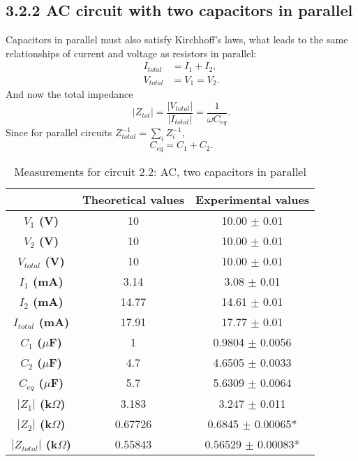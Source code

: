 \documentclass[a4paper, 12pt]{article}
\begin{document}
\subsection{3.2.2 AC circuit with two capacitors in parallel}
Capacitors in parallel must also satisfy Kirchhoff's laws, what leads to the same relationships of current and voltage as resistors in parallel:
\begin{align*}
	I_{total} &= I_1 + I_2, \\
	V_{total} &= V_1 = V_2.
\end{align*}
And now the total impedance 
\begin{equation}\label{ztotcappar}
	|Z_{tot}| = \frac{|V_{total}|}{|I_{total}|} = \frac{1}{\omega C_{eq}}.
\end{equation}
Since for parallel circuits $Z_{total}^{-1} = \sum_i Z_i^{-1}$,
\begin{equation}\label{ceq2}
	C_{eq} = C_1 + C_2.
\end{equation}
\begin{table}[hbt!]
	\centering
	\begin{tabular}{|c|c|c|}
		\hline
		& \textbf{Theoretical values} & \textbf{Experimental values} \\
		\hline
		\textbf{$V_{1}$ (V)} & 10 & 10.00 $\pm$ 0.01 \\
		\textbf{$V_{2}$ (V)} & 10 & 10.00 $\pm$ 0.01 \\
		\textbf{$V_{total}$ (V)} & 10 & 10.00 $\pm$ 0.01\\
		\hline
		\textbf{$I_{1}$ (mA)} & 3.14 & 3.08 $\pm$ 0.01 \\
		\textbf{$I_{2}$ (mA)} & 14.77 & 14.61 $\pm$ 0.01 \\
		\textbf{$I_{total}$ (mA)} & 17.91 & 17.77 $\pm$ 0.01 \\
		\hline
		\textbf{$C_{1}$ ($\mu$F)} & 1 & 0.9804 $\pm$ 0.0056 \\
		\textbf{$C_{2}$ ($\mu$F)} & 4.7 & 4.6505 $\pm$ 0.0033 \\
		\textbf{$C_{eq}$ ($\mu$F)} & 5.7 & 5.6309 $\pm$ 0.0064 \\
		\hline
		\textbf{$|Z_{1}|$ (k$\Omega$)} & 3.183 & 3.247 $\pm$ 0.011 \\
		\textbf{$|Z_{2}|$ (k$\Omega$)} & 0.67726 & 0.6845 $\pm$ 0.00065* \\
		\textbf{$|Z_{total}|$ (k$\Omega$)} & 0.55843 & 0.56529 $\pm$ 0.00083* \\
		\hline
	\end{tabular}
	\caption{Measurements for circuit 2.2: AC, two capacitors in parallel}
\end{table}\\
\end{document}
